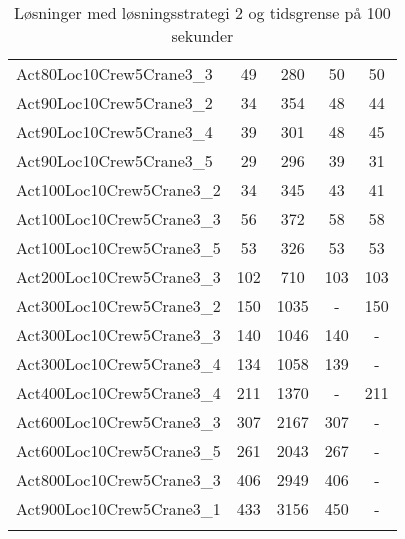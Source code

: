 \begin{center}
\begin{longtable}{ | l | c | c | c | c | }
Act80Loc10Crew5Crane3\_3	&	49	&	280	&	50	&	50	\\
Act90Loc10Crew5Crane3\_2	&	34	&	354	&	48	&	44	\\
Act90Loc10Crew5Crane3\_4	&	39	&	301	&	48	&	45	\\
Act90Loc10Crew5Crane3\_5	&	29	&	296	&	39	&	31	\\
Act100Loc10Crew5Crane3\_2	&	34	&	345	&	43	&	41	\\
Act100Loc10Crew5Crane3\_3	&	56	&	372	&	58	&	58	\\
Act100Loc10Crew5Crane3\_5	&	53	&	326	&	53	&	53	\\
Act200Loc10Crew5Crane3\_3	&	102	&	710	&	103	&	103	\\
Act300Loc10Crew5Crane3\_2	&	150	&	1035	&	-	&	150	\\
Act300Loc10Crew5Crane3\_3	&	140	&	1046	&	140	&	-	\\
Act300Loc10Crew5Crane3\_4	&	134	&	1058	&	139	&	-	\\
Act400Loc10Crew5Crane3\_4	&	211	&	1370	&	-	&	211	\\
Act600Loc10Crew5Crane3\_3	&	307	&	2167	&	307	&	-	\\
Act600Loc10Crew5Crane3\_5	&	261	&	2043	&	267	&	-	\\
Act800Loc10Crew5Crane3\_3	&	406	&	2949	&	406	&	-	\\
Act900Loc10Crew5Crane3\_1	&	433	&	3156	&	450	&	-	\\
\hline		
\caption{Løsninger med løsningsstrategi 2 og tidsgrense på 100 sekunder}										
\label{tab:solutionSSTFAARF100s}								
\end{longtable}				
\end{center}							